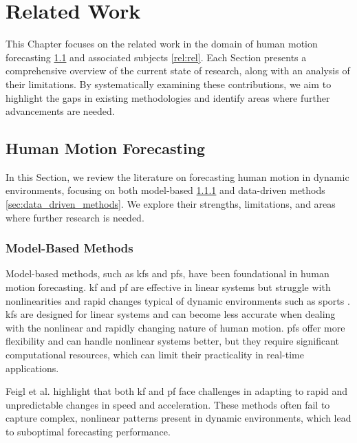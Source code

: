 \chapter{Related Work}
\label{chapt:rel_work}
This Chapter focuses on the related work in the domain of human motion forecasting \ref{rel:human_motion} and associated subjects \ref{rel:rel}. Each Section presents a comprehensive overview of the current state of research, along with an analysis of their limitations. By systematically examining these contributions, we aim to highlight the gaps in existing methodologies and identify areas where further advancements are needed.

\section{Human Motion Forecasting}
\label{rel:human_motion}
In this Section, we review the literature on forecasting human motion in dynamic environments, focusing on both model-based \ref{sec:model_based_methods} and data-driven methods \ref{sec:data_driven_methods}. We explore their strengths, limitations, and areas where further research is needed.

\subsection{Model-Based Methods}
\label{sec:model_based_methods}
Model-based methods, such as \glspl{kf} and \glspl{pf}, have been foundational in human motion forecasting. \gls{kf} and \gls{pf} are effective in linear systems but struggle with nonlinearities and rapid changes typical of dynamic environments such as sports \cite{diss_tobi}. \glspl{kf} are designed for linear systems and can become less accurate when dealing with the nonlinear and rapidly changing nature of human motion. \glspl{pf} offer more flexibility and can handle nonlinear systems better, but they require significant computational resources, which can limit their practicality in real-time applications.

Feigl et al. \cite{diss_tobi} highlight that both \gls{kf} and \gls{pf} face challenges in adapting to rapid and unpredictable changes in speed and acceleration. These methods often fail to capture complex, nonlinear patterns present in dynamic environments, which lead to suboptimal forecasting performance.

